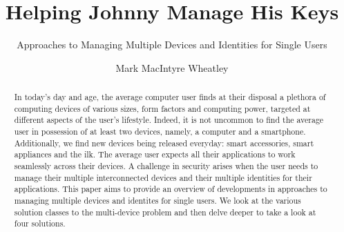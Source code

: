 \documentclass[sigconf]{acmart}
\begin{document}
\title{Helping Johnny Manage His Keys}
\subtitle{Approaches to Managing Multiple Devices and Identities for Single Users}


\author{Mark MacIntyre Wheatley}

\begin{abstract}

In today's day and age, the average computer user finds at their disposal a plethora of computing devices of various sizes, form factors and computing power, targeted at different aspects of the user's lifestyle. Indeed, it is not uncommon to find the average user in possession of at least two devices, namely, a computer and a smartphone. Additionally, we find new devices being released everyday: smart accessories, smart appliances and the ilk. The average user expects all their applications to work seamlessly across their devices. A challenge in security arises when the user needs to manage their multiple interconnected devices and their multiple identities for their applications.
This paper aims to provide an overview of developments in approaches to managing multiple devices and identites for single users. We look at the various solution classes to the multi-device problem and then delve deeper to take a look at four solutions.

\end{abstract}


\maketitle





\balance
 
\end{document}
